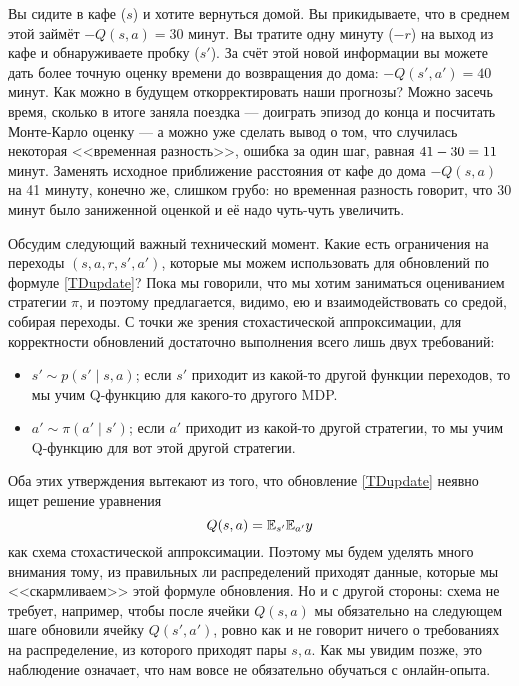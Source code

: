 \begin{exampleBox}[label=ex:cafe]{}
Вы сидите в кафе ($s$) и хотите вернуться домой. Вы прикидываете, что в среднем этой займёт $-Q(s, a) = 30$ минут. Вы тратите одну минуту ($-r$) на выход из кафе и обнаруживаете пробку ($s'$). За счёт этой новой информации вы можете дать более точную оценку времени до возвращения до дома: $-Q(s', a') = 40$ минут. Как можно в будущем откорректировать наши прогнозы? Можно засечь время, сколько в итоге заняла поездка --- доиграть эпизод до конца и посчитать Монте-Карло оценку --- а можно уже сделать вывод о том, что случилась некоторая <<временная разность>>, ошибка за один шаг, равная $41 - 30 \HM= 11$ минут. Заменять исходное приближение расстояния от кафе до дома $-Q(s, a)$ на 41 минуту, конечно же, слишком грубо: но временная разность говорит, что 30 минут было заниженной оценкой и её надо чуть-чуть увеличить.
\end{exampleBox}

Обсудим следующий важный технический момент. Какие есть ограничения на переходы $(s, a, r, s', a')$, которые мы можем использовать для обновлений по формуле \eqref{TDupdate}? Пока мы говорили, что мы хотим заниматься оцениванием стратегии $\pi$, и поэтому предлагается, видимо, ею и взаимодействовать со средой, собирая переходы. С точки же зрения стохастической аппроксимации, для корректности обновлений достаточно выполнения всего лишь двух требований:
\begin{itemize}
    \item $s' \sim p(s' \mid s, a)$; если $s'$ приходит из какой-то другой функции переходов, то мы учим Q-функцию для какого-то другого MDP.
    \item $a' \sim \pi(a' \mid s')$; если $a'$ приходит из какой-то другой стратегии, то мы учим Q-функцию для вот этой другой стратегии.
\end{itemize}
Оба этих утверждения вытекают из того, что обновление \eqref{TDupdate} неявно ищет решение уравнения
$$Q(s, a) = \mathbb{E}_{s'} \mathbb{E}_{a'} y$$
как схема стохастической аппроксимации. Поэтому мы будем уделять много внимания тому, из правильных ли распределений приходят данные, которые мы <<скармливаем>> этой формуле обновления. Но и с другой стороны: схема не требует, например, чтобы после ячейки $Q(s, a)$ мы обязательно на следующем шаге обновили ячейку $Q(s', a')$, ровно как и не говорит ничего о требованиях на распределение, из которого приходят пары $s, a$. Как мы увидим позже, это наблюдение означает, что нам вовсе не обязательно обучаться с онлайн-опыта.

